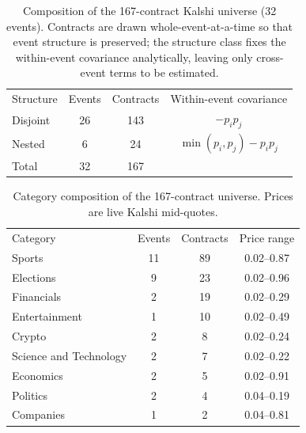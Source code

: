 
\begin{table}[b]
\caption{\label{tab:contracts}Composition of the 167-contract Kalshi universe (32 events).  Contracts are drawn whole-event-at-a-time so that event structure is preserved; the structure class fixes the within-event covariance analytically, leaving only cross-event terms to be estimated.}
\begin{ruledtabular}
\begin{tabular}{lccc}
Structure & Events & Contracts & Within-event covariance \\
\colrule
Disjoint & 26 & 143 & $-p_i p_j$ \\
Nested & 6 & 24 & $\min(p_i,p_j)-p_i p_j$ \\
\colrule
Total & 32 & 167 & \\
\end{tabular}
\end{ruledtabular}
\end{table}


\begin{table}[b]
\caption{\label{tab:categories}Category composition of the 167-contract universe.  Prices are live Kalshi mid-quotes.}
\begin{ruledtabular}
\begin{tabular}{lccc}
Category & Events & Contracts & Price range \\
\colrule
Sports & 11 & 89 & 0.02--0.87 \\
Elections & 9 & 23 & 0.02--0.96 \\
Financials & 2 & 19 & 0.02--0.29 \\
Entertainment & 1 & 10 & 0.02--0.49 \\
Crypto & 2 & 8 & 0.02--0.24 \\
Science and Technology & 2 & 7 & 0.02--0.22 \\
Economics & 2 & 5 & 0.02--0.91 \\
Politics & 2 & 4 & 0.04--0.19 \\
Companies & 1 & 2 & 0.04--0.81 \\
\end{tabular}
\end{ruledtabular}
\end{table}


